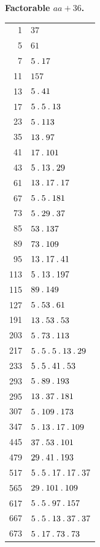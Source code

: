 \par{}
\begin{center}\textbf{Factorable $aa+36$.}\end{center}
\begingroup\small\setlength{\tabcolsep}{5pt}
\begin{longtable}{@{}r|l@{}}
1 & $37$\\
5 & $61$\\
7 & $5\mathbin{.} 17$\\
11 & $157$\\
13 & $5\mathbin{.} 41$\\
17 & $5\mathbin{.} 5\mathbin{.} 13$\\
23 & $5\mathbin{.} 113$\\
35 & $13\mathbin{.} 97$\\
41 & $17\mathbin{.} 101$\\
43 & $5\mathbin{.} 13\mathbin{.} 29$\\
61 & $13\mathbin{.} 17\mathbin{.} 17$\\
67 & $5\mathbin{.} 5\mathbin{.} 181$\\
73 & $5\mathbin{.} 29\mathbin{.} 37$\\
85 & $53\mathbin{.} 137$\\
89 & $73\mathbin{.} 109$\\
95 & $13\mathbin{.} 17\mathbin{.} 41$\\
113 & $5\mathbin{.} 13\mathbin{.} 197$\\
115 & $89\mathbin{.} 149$\\
127 & $5\mathbin{.} 53\mathbin{.} 61$\\
191 & $13\mathbin{.} 53\mathbin{.} 53$\\
203 & $5\mathbin{.} 73\mathbin{.} 113$\\
217 & $5\mathbin{.} 5\mathbin{.} 5\mathbin{.} 13\mathbin{.} 29$\\
233 & $5\mathbin{.} 5\mathbin{.} 41\mathbin{.} 53$\\
293 & $5\mathbin{.} 89\mathbin{.} 193$\\
295 & $13\mathbin{.} 37\mathbin{.} 181$\\
307 & $5\mathbin{.} 109\mathbin{.} 173$\\
347 & $5\mathbin{.} 13\mathbin{.} 17\mathbin{.} 109$\\
445 & $37\mathbin{.} 53\mathbin{.} 101$\\
479 & $29\mathbin{.} 41\mathbin{.} 193$\\
517 & $5\mathbin{.} 5\mathbin{.} 17\mathbin{.} 17\mathbin{.} 37$\\
565 & $29\mathbin{.} 101\mathbin{.} 109$\\
617 & $5\mathbin{.} 5\mathbin{.} 97\mathbin{.} 157$\\
667 & $5\mathbin{.} 5\mathbin{.} 13\mathbin{.} 37\mathbin{.} 37$\\
673 & $5\mathbin{.} 17\mathbin{.} 73\mathbin{.} 73$\\

\end{longtable}
